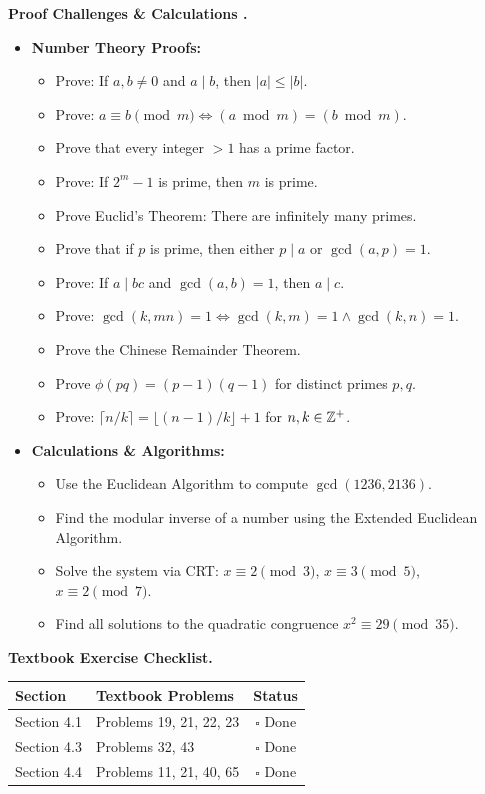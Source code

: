\documentclass{natsirt}
\newcounter{topic}[section]
\newenvironment{challengebox}[1][]{%
    \begin{redbox}[#1]\refstepcounter{topic}\textbf{Proof Challenges \& Calculations \thesection.\thetopic}%
}{\end{redbox}}
\newenvironment{reviewbox}[1][]{\begin{whitebox}[#1]\textbf{Textbook Exercise Checklist. }}{\end{whitebox}}
\newcommand{\citem}{\item[$\square$]}
\begin{document}
\begin{challengebox}
    \begin{itemize}
        \citem \textbf{Number Theory Proofs:}
        \begin{itemize}
            \item Prove: If $a, b \neq 0$ and $a \mid b$, then $|a| \le |b|$.
            \item Prove: $a \equiv b \pmod m \iff (a \bmod m) = (b \bmod m)$.
            \item Prove that every integer $> 1$ has a prime factor.
            \item Prove: If $2^m - 1$ is prime, then $m$ is prime.
            \item Prove Euclid's Theorem: There are infinitely many primes.
            \item Prove that if $p$ is prime, then either $p \mid a$ or $\gcd(a, p) = 1$.
            \item Prove: If $a \mid bc$ and $\gcd(a, b) = 1$, then $a \mid c$.
            \item Prove: $\gcd(k, mn) = 1 \iff \gcd(k, m) = 1 \land \gcd(k, n) = 1$.
            \item Prove the Chinese Remainder Theorem.
            \item Prove $\phi(pq) = (p-1)(q-1)$ for distinct primes $p, q$.
            \item Prove: $\lceil n/k \rceil = \lfloor (n-1)/k \rfloor + 1$ for $n, k \in \mathbb{Z}^+$.
        \end{itemize}
        \citem \textbf{Calculations \& Algorithms:}
        \begin{itemize}
            \item Use the Euclidean Algorithm to compute $\gcd(1236, 2136)$.
            \item Find the modular inverse of a number using the Extended Euclidean Algorithm.
            \item Solve the system via CRT: $x \equiv 2 \pmod 3$, $x \equiv 3 \pmod 5$, $x \equiv 2 \pmod 7$.
            \item Find all solutions to the quadratic congruence $x^2 \equiv 29 \pmod{35}$.
        \end{itemize}
    \end{itemize}
\end{challengebox}

\begin{reviewbox}
    \begin{center}
    \begin{tabular}{|l|l|c|}
        \hline
        \textbf{Section} & \textbf{Textbook Problems} & \textbf{Status} \\
        \hline
        Section 4.1 & Problems 19, 21, 22, 23 & $\square$ Done \\
        Section 4.3 & Problems 32, 43 & $\square$ Done \\
        Section 4.4 & Problems 11, 21, 40, 65 & $\square$ Done \\
        \hline
    \end{tabular}
    \end{center}
\end{reviewbox}
\end{document}
